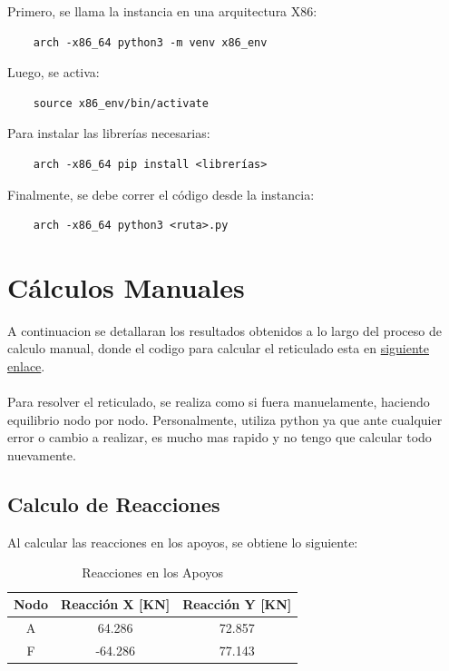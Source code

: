 Primero, se llama la instancia en una arquitectura X86:

\begin{verbatim}
    arch -x86_64 python3 -m venv x86_env
\end{verbatim}

Luego, se activa:

\begin{verbatim}
    source x86_env/bin/activate
\end{verbatim}

Para instalar las librerías necesarias:

\begin{verbatim}
    arch -x86_64 pip install <librerías>
\end{verbatim}

Finalmente, se debe correr el código desde la instancia:

\begin{verbatim}
    arch -x86_64 python3 <ruta>.py
\end{verbatim}

\section{Cálculos Manuales}

A continuacion se detallaran los resultados obtenidos a lo largo del proceso de calculo manual, donde el codigo para calcular el reticulado esta en \href{https://github.com/LukasWolff2002/PROYECTO_3_MCOC/blob/main/CODIGO/CODIGO_MANUAL/solucion_reticulado.py}{siguiente enlace}.
\\ \\
Para resolver el reticulado, se realiza como si fuera manuelamente, haciendo equilibrio nodo por nodo. Personalmente, utiliza python ya que ante cualquier error o cambio a realizar, es mucho mas rapido y no tengo que calcular todo nuevamente.

\subsection{Calculo de Reacciones}

Al calcular las reacciones en los apoyos, se obtiene lo siguiente:

\begin{table}[H]
    \centering
    \begin{tabular}{|c|c|c|}
    \hline
    \textbf{Nodo} & \textbf{Reacción X [KN]} & \textbf{Reacción Y [KN]}  \\ 
    \hline
    A & 64.286 & 72.857  \\ 
    F & -64.286 & 77.143  \\ 
    \hline
    \end{tabular}
    \caption{Reacciones en los Apoyos}
\end{table}

